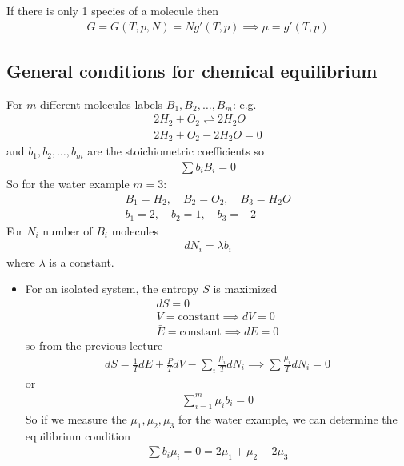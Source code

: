 \documentclass[../main.tex]{subfiles}
\begin{document}
If there is only 1 species of a molecule then
\begin{align*}
    G = G(T,p, N) = N g' (T,p) \implies \mu = g'(T,p)
\end{align*}

\newpage
{}
\subsection{General conditions for chemical equilibrium}
For $m$ different molecules labels $B_1, B_2, \dots, B_m$: e.g.
\begin{gather*}
    2H_2 + O_2 \rightleftharpoons 2H_2O \\
    2H_2 + O_2 - 2H_2O = 0
\end{gather*}
and $b_1, b_2, \dots, b_m$ are the stoichiometric coefficients so
\begin{align*}
    \sum b_i B_i = 0
\end{align*}
So for the water example $m = 3$:
\begin{gather*}
    B_1 = H_2, \quad B_2 = O_2, \quad B_3 = H_2O \\
    b_1 = 2, \quad b_2 = 1, \quad b_3 = -2
\end{gather*}
For $N_i$ number of $B_i$ molecules
\begin{align*}
    dN_i = \lambda b_i
\end{align*}
where $\lambda$ is a constant.

\begin{itemize}
    \item For an isolated system, the entropy $S$ is maximized 
    \begin{gather*}
        dS = 0 \\
        V = \textrm{constant}  \implies dV = 0 \\
        \bar E = \textrm{constant} \implies dE = 0
    \end{gather*}
    so from the previous lecture
    \begin{align*}
        dS = \frac{1}{T} dE + \frac{P}{T} dV - \sum_i \frac{\mu_i}{T} dN_i
        \implies \sum \frac{\mu_i}{T} dN_i = 0
    \end{align*}
    or
    \begin{align*}
        \sum_{i = 1}^m \mu_i b_i = 0
    \end{align*}
    So if we measure the $\mu_1, \mu_2, \mu_3$ for the water example, we can determine the equilibrium condition
    \begin{align*}
        \sum b_i \mu_i = 0 = 2 \mu_1 + \mu_2 - 2 \mu_3
    \end{align*}
\end{itemize}
\end{document}

